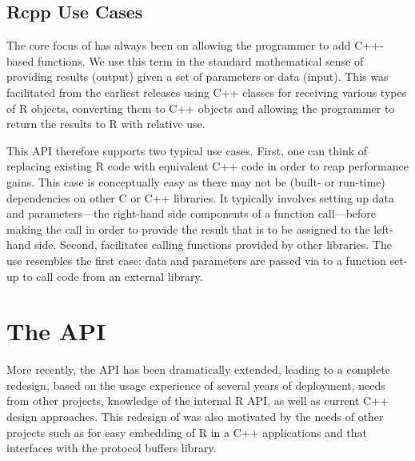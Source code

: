\subsection{Rcpp Use Cases}  %
\label{sec:classic_rcpp}

The core focus of  has always been on allowing the 
programmer to add C++-based functions. 
We use this term in the standard mathematical sense of providing
results (output) given a set of parameters or data (input). 
This was
facilitated from the earliest releases using C++ classes for receiving
various types of R objects, converting them to C++ objects and allowing the
programmer to return the results to R with relative use. 

This API therefore supports two typical use cases. First, one can think of
replacing existing R code with equivalent C++ code in order to reap
performance gains.  This case is conceptually easy as there may not be
(built- or run-time) dependencies on other C or C++ libraries.  It typically
involves setting up data and parameters---the right-hand side components of a
function call---before making the call in order to provide the result that is
to be assigned to the left-hand side. Second,  facilitates calling
functions provided by other libraries. The use resembles the first case: data
and parameters are passed via  to a function set-up to call code
from an external library.  




\section{The  API}
\label{sec:new_rcpp}

More recently, the  API has been dramatically extended, leading to a 
complete redesign, based on the usage experience of several 
years of  deployment, needs from other projects, knowledge 
of the internal R API, as well as current C++ design approaches. 
This redesign of  was also motivated by the needs of other 
projects such as   \citep{cran:rinside} for easy embedding 
of R in a C++ applications and  \citep{cran:rprotobuf} 
that interfaces with the protocol buffers library. 

